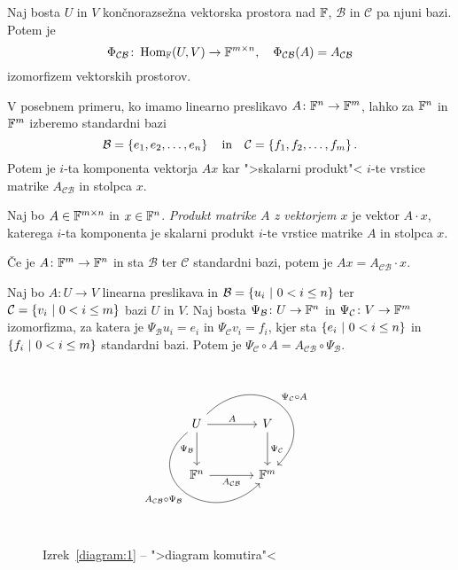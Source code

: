 \documentclass[12pt, a4paper]{article}
\begin{document}
\obvs

\begin{izrek}
Naj bosta $U$ in $V$ končnorazsežna vektorska prostora nad $\mathbb{F}$, $\mathcal{B}$ in $\mathcal{C}$ pa njuni bazi. Potem je
\[
\Phi_{\mathcal{CB}}\colon\operatorname{Hom}_{\mathbb{F}}(U,V)\to\mathbb{F}^{m\times n},\quad \Phi_{\mathcal{CB}}(A)=A_{\mathcal{CB}}
\]
izomorfizem vektorskih prostorov.
\end{izrek}

\obvs

V posebnem primeru, ko imamo linearno preslikavo $A\colon\mathbb{F}^n\to\mathbb{F}^m$, lahko za $\mathbb{F}^n$ in $\mathbb{F}^m$ izberemo standardni bazi
\[
\mathcal{B}=\left\{e_1,e_2,\dots,e_n\right\}
\quad\text{in}\quad
\mathcal{C}=\left\{f_1,f_2,\dots,f_m\right\}.
\]
Potem je $i$-ta komponenta vektorja $Ax$ kar ">skalarni produkt"< $i$-te vrstice matrike $A_{\mathcal{CB}}$ in stolpca $x$.

\begin{definicija}
Naj bo $A\in\mathbb{F}^{m\times n}$ in $x\in\mathbb{F}^n$. \emph{Produkt matrike $A$ z vektorjem $x$} je vektor $A\cdot x$, katerega $i$-ta komponenta je skalarni produkt $i$-te vrstice matrike $A$ in stolpca $x$.
\end{definicija}

\begin{opomba}
Če je $A\colon\mathbb{F}^m\to\mathbb{F}^n$ in sta $\mathcal{B}$ ter $\mathcal{C}$ standardni bazi, potem je $Ax=A_{\mathcal{CB}}\cdot x$.
\end{opomba}

\begin{izrek}\label{diagram:1}
Naj bo $A\colon U\to V$ linearna preslikava in $\mathcal{B}=\left\{u_i~\middle\vert~0<i\leq n\right\}$ ter $\mathcal{C}=\left\{v_i~\middle\vert~0<i\leq m\right\}$ bazi $U$ in $V$. Naj bosta $\Psi_{\mathcal{B}}\colon U\to\mathbb{F}^n$ in $\Psi_{\mathcal{C}}\colon V\to\mathbb{F}^m$ izomorfizma, za katera je $\Psi_{\mathcal{B}}u_i=e_i$ in $\Psi_{\mathcal{C}}v_i=f_i$, kjer sta $\left\{e_i~\middle\vert~0<i\leq n\right\}$ in $\left\{f_i~\middle\vert~0<i\leq m\right\}$ standardni bazi. Potem je $\Psi_{\mathcal{C}}\circ A=A_{\mathcal{CB}}\circ\Psi_{\mathcal{B}}$.
\end{izrek}

\begin{figure}[H]
\[
\begin{tikzcd}[column sep=large, row sep=large]
U
\arrow[r, "A"]
\arrow[d, "\Psi_{\mathcal{B}}"']
\arrow[dr, out=45, in=45, looseness=2, "\Psi_{\mathcal{C}}\circ A"]
\arrow[dr, out=220, in=225, looseness=2, "A_{\mathcal{CB}}\circ \Psi_{\mathcal{B}}"'] & V \arrow[d, "\Psi_{\mathcal{C}}"] \\
\F^n \arrow[r, "A_{\mathcal{CB}}"'] & \F^m
\end{tikzcd}
\]
\caption{Izrek~\ref{diagram:1} -- ">diagram komutira"<}
\end{figure}
\end{document}
